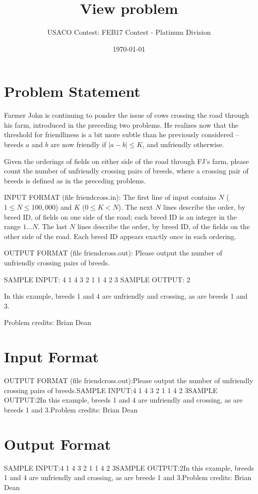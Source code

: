 \documentclass[12pt]{article}
\title{View problem}
\author{USACO Contest: FEB17 Contest - Platinum Division}
\date{\today}
\begin{document}
\maketitle

\section*{Problem Statement}

Farmer John is continuing to ponder the issue of cows crossing the road through
his farm, introduced in the preceding two problems.  He realizes now that the
threshold for friendliness is a bit more subtle than he previously considered --
breeds $a$ and $b$ are now friendly if $|a - b| \leq K$, and unfriendly
otherwise.

Given the orderings of fields on either side of the road through FJ's farm,
please count the number of unfriendly crossing pairs of breeds, where a crossing
pair of breeds is defined as in the preceding problems.

INPUT FORMAT (file friendcross.in):
The first line of input contains $N$ ($1 \leq N \leq 100,000$) and $K$
($0 \leq K < N$).  The next $N$ lines describe the order, by breed ID, of fields
on one side of the road; each breed ID is an integer in the range $1 \ldots N$. 
The last $N$ lines describe the order, by  breed ID, of the fields on the other
side of the road.  Each breed ID appears exactly once in each ordering.

OUTPUT FORMAT (file friendcross.out):
Please output the number of unfriendly crossing pairs of breeds.

SAMPLE INPUT:
4 1
4
3
2
1
1
4
2
3
SAMPLE OUTPUT: 
2

In this example, breeds 1 and 4 are unfriendly and crossing, as are breeds 1 and 3.

Problem credits: Brian Dean



\section*{Input Format}
OUTPUT FORMAT (file friendcross.out):Please output the number of unfriendly crossing pairs of breeds.SAMPLE INPUT:4 1
4
3
2
1
1
4
2
3SAMPLE OUTPUT:2In this example, breeds 1 and 4 are unfriendly and crossing, as are breeds 1 and 3.Problem credits: Brian Dean

\section*{Output Format}
SAMPLE INPUT:4 1
4
3
2
1
1
4
2
3SAMPLE OUTPUT:2In this example, breeds 1 and 4 are unfriendly and crossing, as are breeds 1 and 3.Problem credits: Brian Dean
\end{document}
